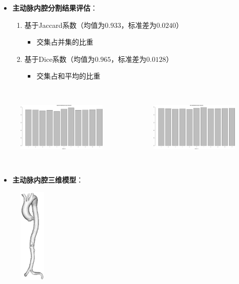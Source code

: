 \begin{frame}
\begin{itemize}
  \item \textbf{主动脉内腔分割结果评估}：
  \begin{enumerate}
     \item 基于Jaccard系数（均值为$0.933$，标准差为$0.0240$）
	\begin{itemize}
	 \item 交集占并集的比重
	\end{itemize}
     \item 基于Dice系数（均值为$0.965$，标准差为$0.0128$）
	\begin{itemize}
	 \item 交集占和平均的比重
	\end{itemize}
  \end{enumerate}
\end{itemize}
\begin{columns}[b,onlytextwidth]
\begin{column}{.5\textwidth}
 \begin{figure}[t]
\centering
\includegraphics[width=1.8in,height=1.3in]{../../Figures/gac/Jaccard.eps}
\end{figure}
\end{column}
\begin{column}{.5\textwidth}
 \begin{figure}[t]
\centering
\includegraphics[width=1.8in,height=1.3in]{../../Figures/gac/Dice.eps}
\end{figure}
\end{column}
\end{columns}
\end{frame} 

\begin{frame}
\begin{itemize}
  \item \textbf{主动脉内腔三维模型}：
\end{itemize}
\begin{figure}[t]
\centering
\includegraphics[height=1.8in]{../../Figures/gac/model.eps}
\end{figure} 
\end{frame} 
